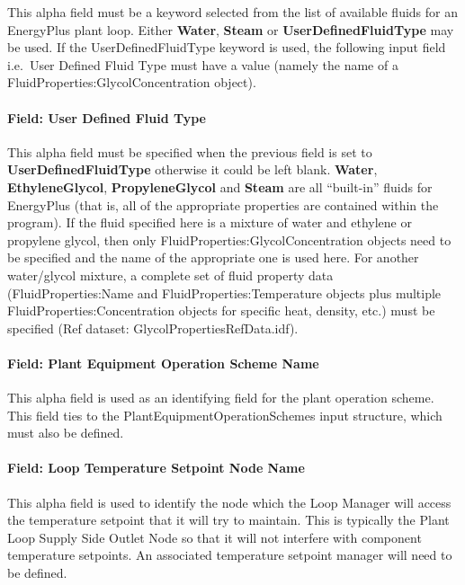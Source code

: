 This alpha field must be a keyword selected from the list of available fluids for an EnergyPlus plant loop. Either \textbf{Water}, \textbf{Steam} or \textbf{UserDefinedFluidType} may be used. If the UserDefinedFluidType keyword is used, the following input field i.e.~User Defined Fluid Type must have a value (namely the name of a FluidProperties:GlycolConcentration object).

\paragraph{Field: User Defined Fluid Type}\label{field-user-defined-fluid-type-000}

This alpha field must be specified when the previous field is set to \textbf{UserDefinedFluidType} otherwise it could be left blank. \textbf{Water}, \textbf{EthyleneGlycol}, \textbf{PropyleneGlycol} and \textbf{Steam} are all ``built-in'' fluids for EnergyPlus (that is, all of the appropriate properties are contained within the program). If the fluid specified here is a mixture of water and ethylene or propylene glycol, then only FluidProperties:GlycolConcentration objects need to be specified and the name of the appropriate one is used here. For another water/glycol mixture, a complete set of fluid property data (FluidProperties:Name and FluidProperties:Temperature objects plus multiple FluidProperties:Concentration objects for specific heat, density, etc.) must be specified (Ref dataset: GlycolPropertiesRefData.idf).

\paragraph{Field: Plant Equipment Operation Scheme Name}\label{field-plant-equipment-operation-scheme-name}

This alpha field is used as an identifying field for the plant operation scheme. This field ties to the PlantEquipmentOperationSchemes input structure, which must also be defined.

\paragraph{Field: Loop Temperature Setpoint Node Name}\label{field-loop-temperature-setpoint-node-name}

This alpha field is used to identify the node which the Loop Manager will access the temperature setpoint that it will try to maintain. This is typically the Plant Loop Supply Side Outlet Node so that it will not interfere with component temperature setpoints. An associated temperature setpoint manager will need to be defined.

